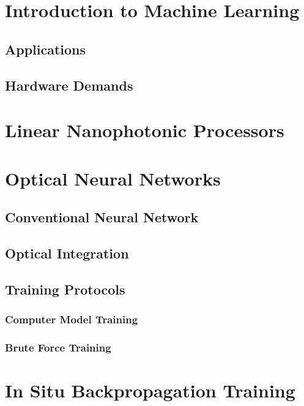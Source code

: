 
\section{Introduction to Machine Learning}

\subsection{Applications}

\subsection{Hardware Demands}

\section{Linear Nanophotonic Processors}

\section{Optical Neural Networks}

\subsection{Conventional Neural Network}

\subsection{Optical Integration}

\subsection{Training Protocols}

\subsubsection{Computer Model Training}

\subsubsection{Brute Force Training}

\section{In Situ Backpropagation Training}

